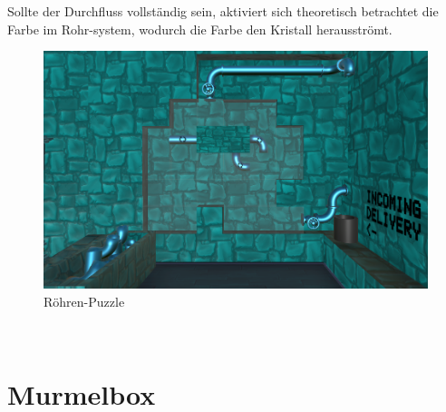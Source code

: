 Sollte der Durchfluss vollständig sein, aktiviert sich theoretisch betrachtet die Farbe im Rohr-system, wodurch die Farbe den Kristall herausströmt.
\begin{figure}[h]
	\centering
	\includegraphics[width=\textwidth/2]{Pictures/Roehren}
	\caption{Röhren-Puzzle}
	\label{fig:cyan}
\end{figure}\\

\newpage

\section{Murmelbox}
